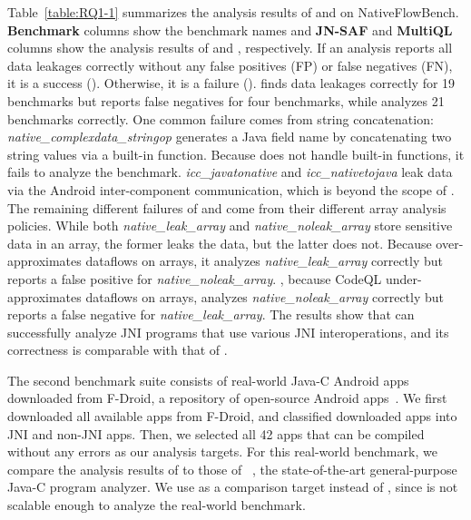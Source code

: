 Table~\ref{table:RQ1-1} summarizes the analysis
results of \jnsaf and \ours on NativeFlowBench.
{\bf Benchmark} columns show the benchmark names
and {\bf JN-SAF} and {\bf MultiQL} columns show 
the analysis results of \jnsaf and \ours, respectively.
If an analysis reports all data leakages correctly without any
false positives (FP) or false negatives (FN), it is a success (\cmark).
Otherwise, it is a failure (\xmark).
\ours finds data leakages correctly for 19 benchmarks but reports false
negatives for four benchmarks, while \jnsaf analyzes 21 benchmarks correctly. 
One common failure comes from string concatenation:
{\it native\_complexdata\_stringop} generates a Java field name by
concatenating two string values via a built-in function.
Because \ours does not handle built-in functions, it fails to analyze the benchmark.
{\it icc\_javatonative} and {\it icc\_nativetojava} leak data via the Android
inter-component communication, which is beyond the scope of \ours.
The remaining different failures of \ours and \jnsaf come from
their different array analysis policies.
While both {\it native\_leak\_array} and {\it native\_noleak\_array} store sensitive data in an array,
the former leaks the data, but the latter does not.
Because \jnsaf over-approximates dataflows on arrays,
it analyzes {\it native\_leak\_array} correctly but reports a false positive for {\it native\_noleak\_array}.
, because CodeQL under-approximates dataflows on arrays,
\ours analyzes {\it native\_noleak\_array} correctly but reports a false negative for
{\it native\_leak\_array}.
%
The results show that \ours can successfully analyze JNI programs that
use various JNI interoperations, and its correctness is comparable with that of \jnsaf.

The second benchmark suite consists of real-world Java-C Android apps downloaded from
F-Droid, a repository of open-source Android apps~\cite{fdroid}.  We first
downloaded all available apps from F-Droid, and classified downloaded apps into JNI and non-JNI apps.
Then, we selected all 42 apps that can be compiled without any errors as our analysis targets.
For this real-world benchmark, we compare the analysis results of
\ours to those of \lees~\cite{LeeASE20},
the state-of-the-art general-purpose Java-C program analyzer.
We use \lees as a comparison target instead of \jnsaf,
since \jnsaf is not scalable enough to analyze the real-world benchmark.



